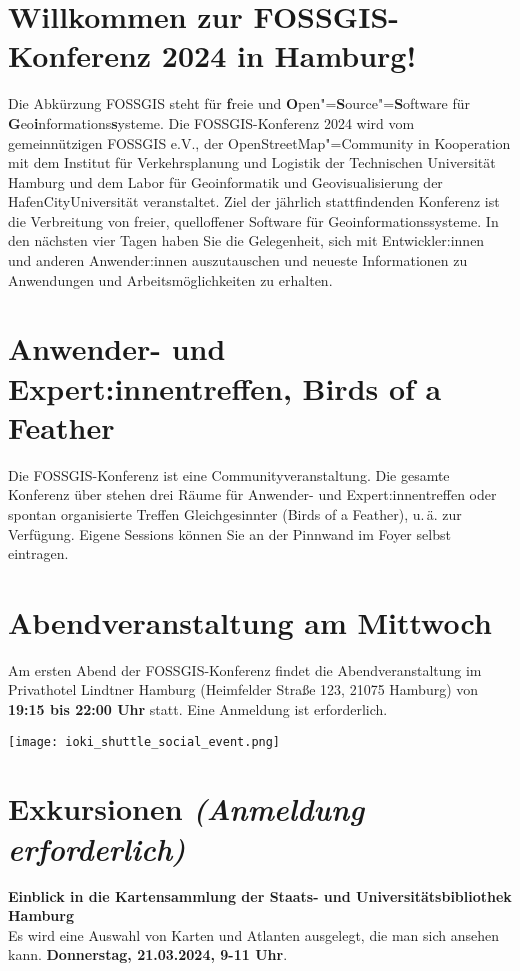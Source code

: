 \newpage
\section*{Willkommen zur FOSSGIS-Konferenz 2024 in Hamburg!}\label{welcome}
Die Abkürzung { FOSSGIS} steht für {\bfseries f}reie und {\bfseries O}pen"={\bfseries S}ource"={\bfseries S}oftware für {\bfseries G}eo{\bfseries i}nformations{\bfseries s}ysteme.
Die FOSSGIS-Konferenz 2024 wird vom gemeinnützigen FOSSGIS e.V., der
OpenStreetMap"=Community in Kooperation mit dem Institut für Verkehrsplanung und Logistik der Technischen Universität Hamburg und dem Labor für Geoinformatik und Geovisualisierung der HafenCityUniversität veranstaltet. 
Ziel der jährlich stattfindenden Konferenz ist die Verbreitung von freier,
quelloffener Software für Geoinformationssysteme. In den nächsten vier Tagen
haben Sie die Gelegenheit, sich mit Entwickler:innen und anderen Anwender:innen
auszutauschen und \mbox{neueste} Informationen zu Anwendungen und
Arbeitsmöglichkeiten zu erhalten.

\section*{Anwender- und Expert:innentreffen, Birds of a Feather}
Die FOSSGIS-Konferenz ist eine Communityveranstaltung.
Die gesamte Konferenz über stehen drei Räume für Anwender- und Expert:innentreffen oder spontan organisierte Treffen Gleichgesinnter (Birds of a Feather), u.\,ä.
zur Verfügung. Eigene Sessions können Sie an der Pinnwand im Foyer selbst eintragen.

\section*{Abendveranstaltung am Mittwoch}\label{schwaetzli}
Am ersten Abend der FOSSGIS-Konferenz findet die Abendveranstaltung im Privathotel Lindtner Hamburg (Heimfelder Straße 123, 21075 Hamburg) von {\bfseries 19:15 bis 22:00 Uhr} statt. Eine Anmeldung ist erforderlich.
\bigskip

\begin{minipage}[c]{0.9\textwidth}
  \texttt{[image: ioki\_shuttle\_social\_event.png]}
\end{minipage}


\section*{Exkursionen {\normalfont\em (Anmeldung erforderlich)}}
\noindent
{\large \bfseries Einblick in die Kartensammlung der Staats- und Universitätsbibliothek Hamburg}\\
Es wird eine Auswahl von Karten und Atlanten ausgelegt, die man sich ansehen kann. {\bfseries Donnerstag, 21.03.2024, 9-11 Uhr}.
\bigskip

